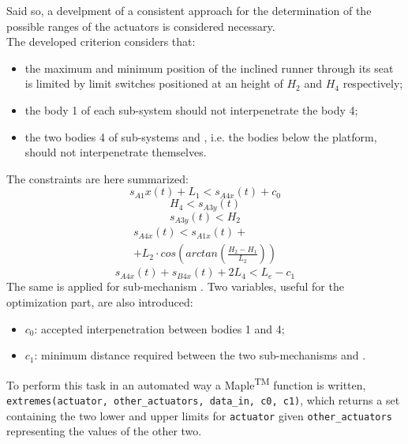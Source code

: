 \documentclass[10.5pt, twocolumn]{article}
\newcommand*\circled[1]{\tikz[baseline=(char.base)]{
  \node[shape=circle,draw,inner sep=2pt] (char) {#1};}}
\begin{document}
Said so, a develpment of a consistent approach for the determination of the possible ranges of the actuators is considered necessary.\\
The developed criterion considers that:
\begin{itemize}
  \item the maximum and minimum position of the inclined runner through its seat is limited by limit switches positioned at an height of \( H_2 \) and \( H_4 \) respectively;
  \item the body 1 of each sub-system should not interpenetrate the body 4;
  \item the two bodies 4 of sub-systems \circled{A} and \circled{B}, i.e. the bodies below the platform, should not interpenetrate themselves.
\end{itemize}
The constraints are here summarized:
\begin{equation}
    s_{A1}x(t)+L_1 < s_{A4x}(t)+c_0
\end{equation}
\begin{equation}
    H_4 < s_{A3y}(t)
\end{equation}
\begin{equation}
   s_{A3y}(t) < H_2
\end{equation}
\begin{multline}
    s_{A4x}(t) < s_{A1x}(t)+\\
    +L_2 \cdot cos(arctan(\frac{H_2-H_1}{L_2}))
\end{multline}
\begin{equation}
   s_{A4x}(t)+s_{B4x}(t)+2 L_4 < L_e-c_1
\end{equation}
The same is applied for sub-mechanism \circled{B}.
Two variables, useful for the optimization part, are also introduced:
\begin{itemize}
  \item \( c_0 \): accepted interpenetration between bodies 1 and 4;
  \item \( c_1 \): minimum distance required between the two sub-mechanisms \circled{A} and \circled{B}.
\end{itemize}

To perform this task in an automated way a Maple\textsuperscript{TM} function is written, \texttt{extremes(actuator, other\_actuators, data\_in, c0, c1)}, which returns a set containing the two lower and upper limits for \texttt{actuator} given \texttt{other\_actuators} representing the values of the other two.
\end{document}
